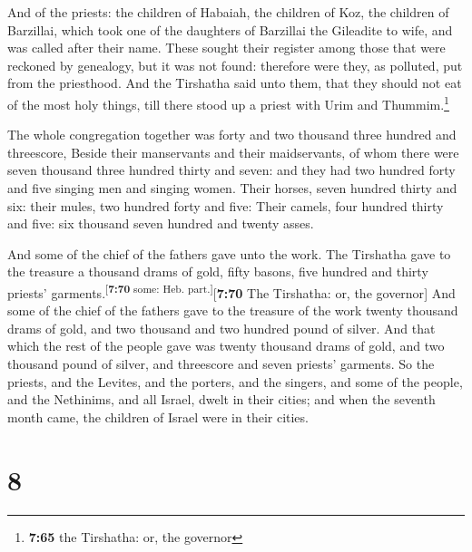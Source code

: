 And of the priests: the children of Habaiah, the
children of Koz, the children of Barzillai, which took one of the
daughters of Barzillai the Gileadite to wife, and was called after their
name.  These sought their register among those that were
reckoned by genealogy, but it was not found: therefore were they, as
polluted, put from the priesthood.  And the Tirshatha
said unto them, that they should not eat of the most holy things, till
there stood up a priest with Urim and Thummim.\footnote{\textbf{7:65}
  the Tirshatha: or, the governor}

 The whole congregation together was forty and two
thousand three hundred and threescore,  Beside their
manservants and their maidservants, of whom there were seven thousand
three hundred thirty and seven: and they had two hundred forty and five
singing men and singing women.  Their horses, seven
hundred thirty and six: their mules, two hundred forty and five:
 Their camels, four hundred thirty and five: six thousand
seven hundred and twenty asses.

 And some of the chief of the fathers gave unto the work.
The Tirshatha gave to the treasure a thousand drams of gold, fifty
basons, five hundred and thirty priests'
garments.\textsuperscript{{[}\textbf{7:70} some: Heb.
part.{]}}{[}\textbf{7:70} The Tirshatha: or, the governor{]}
 And some of the chief of the fathers gave to the
treasure of the work twenty thousand drams of gold, and two thousand and
two hundred pound of silver.  And that which the rest of
the people gave was twenty thousand drams of gold, and two thousand
pound of silver, and threescore and seven priests' garments.
 So the priests, and the Levites, and the porters, and
the singers, and some of the people, and the Nethinims, and all Israel,
dwelt in their cities; and when the seventh month came, the children of
Israel were in their cities.

\hypertarget{section-7}{%
\section{8}\label{section-7}}


